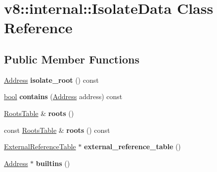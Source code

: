 \hypertarget{classv8_1_1internal_1_1IsolateData}{}\section{v8\+:\+:internal\+:\+:Isolate\+Data Class Reference}
\label{classv8_1_1internal_1_1IsolateData}
\subsection*{Public Member Functions}
\begin{DoxyCompactItemize}
\item 
\mbox{\label{classv8_1_1internal_1_1IsolateData_a1d66e1f1da6ef4e6650c718de28f4f8a}} 
\mbox{\hyperlink{classuintptr__t}{Address}} {\bfseries isolate\+\_\+root} () const
\item 
\mbox{\label{classv8_1_1internal_1_1IsolateData_a31f08986e38286a45fc896cacf57d167}} 
\mbox{\hyperlink{classbool}{bool}} {\bfseries contains} (\mbox{\hyperlink{classuintptr__t}{Address}} address) const
\item 
\mbox{\label{classv8_1_1internal_1_1IsolateData_a064a1b323a85295cbd88fb864eff28eb}} 
\mbox{\hyperlink{classv8_1_1internal_1_1RootsTable}{Roots\+Table}} \& {\bfseries roots} ()
\item 
\mbox{\label{classv8_1_1internal_1_1IsolateData_aa1cf43a7481c664fb2d5cac2112530be}} 
const \mbox{\hyperlink{classv8_1_1internal_1_1RootsTable}{Roots\+Table}} \& {\bfseries roots} () const
\item 
\mbox{\label{classv8_1_1internal_1_1IsolateData_a52b2c122143242b042414e6d1e097920}} 
\mbox{\hyperlink{classv8_1_1internal_1_1ExternalReferenceTable}{External\+Reference\+Table}} $\ast$ {\bfseries external\+\_\+reference\+\_\+table} ()
\item 
\mbox{\label{classv8_1_1internal_1_1IsolateData_a8b8c40be02f2b7b4726bcb0c39a0b6d4}} 
\mbox{\hyperlink{classuintptr__t}{Address}} $\ast$ {\bfseries builtins} ()
\end{DoxyCompactItemize}

